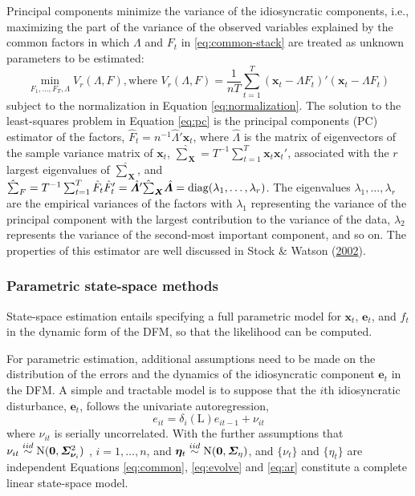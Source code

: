 \documentclass[12pt,twoside]{reedthesis}
\begin{document}
Principal components minimize the variance of the idiosyncratic components, i.e., maximizing the part of the variance of the observed variables explained by the common factors in which \(\bm \varLambda\) and \(F_{t}\) in \eqref{eq:common-stack} are treated as unknown parameters to be estimated:
\begin{equation}
  \min_{F_{1}, \ldots, F_{T}, \bm \varLambda} V_{r}(\bm \varLambda, F), \text{where } V_{r}(\Lambda, F) = \frac{1}{nT} \sum_{t = 1}^{T} (\bm x_{t} - \bm \varLambda F_{t})'(\bm x_{t} - \bm \varLambda F_{t}) \label{eq:pc}
\end{equation}
subject to the normalization in Equation \eqref{eq:normalization}. The solution to the least-squares problem in Equation \eqref{eq:pc} is the principal components (PC) estimator of the factors, \(\hat{F}_{t} = n^{-1} \hat{\bm \varLambda}' \bm x_{t}\), where \(\hat{\bm \varLambda}\) is the matrix of eigenvectors of the sample variance matrix of \(\bm x_{t}\), \(\hat{\sum}_{\bm X} = T^{-1} \sum_{t = 1}^{T} \bm x_{t}\bm x_{t}'\), associated with the \(r\) largest eigenvalues of \(\hat{\sum}_{\bm X}\), and \(\hat {\sum}_{F} = T^{-1} \sum_{t = 1}^{T} \hat{F}_{t} \hat{F}_{t}' = \hat{\bm \varLambda}' \hat{\sum}_{\bm X} \hat{\bm \varLambda} = \operatorname{diag}(\lambda_{1}, \ldots, \lambda_{r})\). The eigenvalues \(\lambda_{1}, \ldots, \lambda_{r}\) are the empirical variances of the factors with \(\lambda_{1}\) representing the variance of the principal component with the largest contribution to the variance of the data, \(\lambda_{2}\) represents the variance of the second-most important component, and so on. The properties of this estimator are well discussed in Stock \& Watson (\protect\hyperlink{ref-stocwats:2002}{2002}).

\hypertarget{parametric-state-space-methods}{%
\subsubsection{Parametric state-space methods}\label{parametric-state-space-methods}}

State-space estimation entails specifying a full parametric model for \(\bm x_{t}\), \(\bm e_{t}\), and \(f_{t}\) in the dynamic form of the DFM, so that the likelihood can be computed.

For parametric estimation, additional assumptions need to be made on the distribution of the errors and the dynamics of the idiosyncratic component \(\bm e_{t}\) in the DFM. A simple and tractable model is to suppose that the \(i\)th idiosyncratic disturbance, \(\bm e_{t}\), follows the univariate autoregression,
\begin{equation}
  e_{it} = \delta_{i} (\ensuremath{\mathrm{L}}) e_{it - 1} + \nu_{it} \label{eq:ar}
\end{equation}
where \(\nu_{it}\) is serially uncorrelated. With the further assumptions that \(\nu_{it} \stackrel{iid}{\sim} \mathrm{N}(\boldsymbol{0}, \bm \varSigma_{\bm \nu_{i}}^{2})\) , \(i = 1, \ldots, n\), and \(\bm \eta_{t} \stackrel{iid}{\sim} \mathrm{N}(\boldsymbol{0}, \bm \varSigma_{\eta})\), and \(\{\nu_{t}\}\) and \(\{\eta_{t}\}\) are independent Equations \eqref{eq:common}, \eqref{eq:evolve} and \eqref{eq:ar} constitute a complete linear state-space model.
\end{document}
